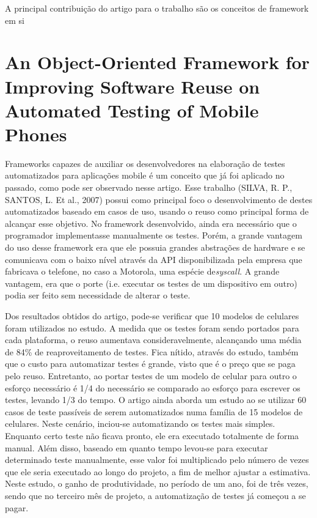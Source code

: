 \documentclass[
    12pt,       %
    openright,      %
    twoside,      %
    a4paper,      %
    english,      %
    french,       %
    spanish,      %
    brazil,       %
    ]{abntex2}
\begin{document}
      A principal contribuição do artigo para o trabalho são os conceitos de framework em si

    \section{An Object-Oriented Framework for Improving Software Reuse on Automated Testing of Mobile Phones}
      Frameworks capazes de auxiliar os desenvolvedores na elaboração de testes automatizados para aplicações
      mobile é um conceito que já foi aplicado no passado, como pode ser observado nesse artigo. Esse
      trabalho (SILVA, R. P., SANTOS, L. Et al., 2007) possui como principal foco o desenvolvimento de destes
      automatizados baseado em casos de uso, usando o reuso como principal forma de alcançar esse objetivo.
      No framework desenvolvido, ainda era necessário que o programador implementasse manualmente os testes.
      Porém, a grande vantagem do uso desse framework era que ele possuia grandes abstrações de hardware
      e se comunicava com o baixo nível através da API disponibilizada pela empresa que fabricava o
      telefone, no caso a Motorola, uma espécie de\textit{syscall}. A grande vantagem, era que o porte
      (i.e. executar os testes de um dispositivo em outro) podia ser feito sem necessidade de alterar o teste.

      Dos resultados obtidos do artigo, pode-se verificar que 10 modelos de celulares foram utilizados no
      estudo. A medida que os testes foram sendo portados para cada plataforma, o reuso aumentava
      consideravelmente, alcançando uma média de 84\% de reaproveitamento de testes. Fica nítido, através
      do estudo, também que o custo para automatizar testes é grande, visto que é o preço que se paga pelo
      reuso. Entretanto, ao portar testes de um modelo de celular para outro o esforço necessário é 1/4 do
      necessário se comparado ao esforço para escrever os testes, levando 1/3 do tempo. O artigo ainda
      aborda um estudo ao se utilizar 60 casos de teste passíveis de serem automatizados numa família de 15
      modelos de celulares. Neste cenário, inciou-se automatizando os testes mais simples. Enquanto certo
      teste não ficava pronto, ele era executado totalmente de forma manual. Além disso, baseado em quanto
      tempo levou-se para executar determinado teste manualmente, esse valor foi multiplicado pelo número de
      vezes que ele seria executado ao longo do projeto, a fim de melhor ajustar a estimativa. Neste estudo,
      o ganho de produtividade, no período de um ano, foi de três vezes, sendo que no terceiro mês de projeto,
      a automatização de testes já começou a se pagar.
\end{document}
